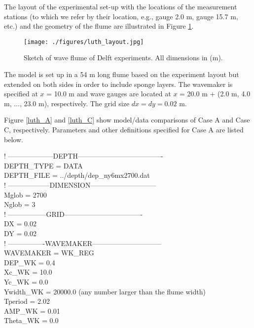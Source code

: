 \documentclass[11pt]{article}
\begin{document}
The layout of the experimental set-up with the locations of the measurement stations (to which we refer by their location, e.g., gauge 2.0 m, gauge 15.7 m, etc.) and the geometry of the flume are illustrated in Figure \ref{luth_layout}.

 \begin{figure}[htbp]
\centering
\texttt{[image: ./figures/luth\_layout.jpg]}
\caption{Sketch of wave flume of Delft experiments. All dimensions in (m).}
\label{luth_layout}
\end{figure}

The model is set up in a 54 m long flume based on the experiment layout but extended on both sides in order to include sponge layers. The wavemaker is specified at $x$ = 10.0 m and wave gauges are located at $x$ = 20.0 m + (2.0 m, 4.0 m, ..., 23.0 m), respectively. The grid size $dx = dy = 0.02$ m. 

Figure \ref{luth_A}  and \ref{luth_C} show model/data comparisons of Case A and Case C, respectively. Parameters and other definitions specified for Case A are listed below. 

   ! --------------------DEPTH------------------------------------- \\
   DEPTH\_TYPE = DATA \\
   DEPTH\_FILE = ../depth/dep\_ny6mx2700.dat \\
   
     ! ------------------DIMENSION----------------------------- \\
 Mglob = 2700 \\
Nglob = 3 \\

! -----------------GRID---------------------------------- \\
DX = 0.02 \\
DY = 0.02 \\

  ! ----------------WAVEMAKER------------------------------ \\
  WAVEMAKER = WK\_REG \\
  DEP\_WK = 0.4 \\
Xc\_WK = 10.0 \\
Yc\_WK = 0.0 \\
Ywidth\_WK = 20000.0  (any number larger than the flume width) \\
 Tperiod = 2.02 \\
AMP\_WK = 0.01 \\
Theta\_WK = 0.0   \\
\end{document}
